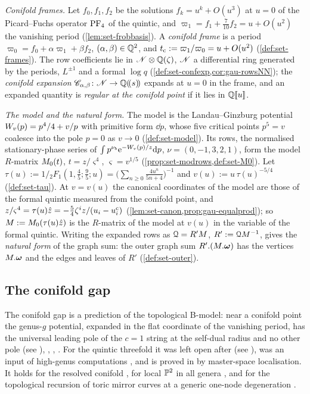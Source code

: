\emph{Conifold frames.} Let $f_0,f_1,f_2$ be the solutions $f_k=u^k+O(u^3)$ at $u=0$ of the Picard--Fuchs operator $\mathrm{PF}_{4}$ of the quintic, and $\varpi_1=f_1+\frac7{10}f_2=u+O(u^2)$ the vanishing period (\cref{lem:set-frobbasis}). A \emph{conifold frame} is a period $\varpi_0=f_0+\alpha\varpi_1+\beta f_2$, $(\alpha,\beta)\in\mathbb{Q}^2$, and $t_{\mathrm{c}}:=\varpi_1/\varpi_0=u+O(u^2)$ (\cref{def:set-frames}). The row coefficients lie in $\mathscr{N}\otimes\mathbb{Q}(\zeta)$, $\mathscr{N}$ a differential ring generated by the periods, $L^{\pm1}$ and a formal $\log q$ (\cref{def:set-confexp,cor:gau-rowsNN}); the \emph{conifold expansion} $\mathscr{C}_{\alpha,\beta}\colon\mathscr{N}\to\mathbb{Q}(\!(s)\!)$ expands at $u=0$ in the frame, and an expanded quantity is \emph{regular at the conifold point} if it lies in $\mathbb{Q}[\![ u ]\!]$.

\emph{The model and the natural form.} The model is the Landau--Ginzburg potential $W_{v}(p)=p^4/4+v/p$ with primitive form $\dd p$, whose five critical points $p^5=v$ coalesce into the pole $p=0$ as $v\to0$ (\cref{def:set-model}). Its rows, the normalised stationary-phase series of $\int p^{\nu_b}\mathrm{e}^{-W_{v}(p)/z}\mathrm{d} p$, $\nu=(0,-1,3,2,1)$, form the model $R$-matrix $M_{0}(t)$, $t=z/\varsigma^4$, $\varsigma=v^{1/5}$ (\cref{prop:set-modrows,def:set-M0}). Let $\tau(u):=1/{}_2F_1(1,\frac45;\frac95;u)=\bigl(\sum_{n\geq0}\frac{4u^n}{5n+4}\bigr)^{-1}$ and $v(u):=u\,\tau(u)^{-5/4}$ (\cref{def:set-tau}). At $v=v(u)$ the canonical coordinates of the model are those of the formal quintic measured from the conifold point, and $z/\varsigma^4=\tau(u)\hat{z}=-\frac54\zeta^iz/(u_i-u_i^{\mathrm c})$ (\cref{lem:set-canon,prop:gau-equalprod}); so $M:=M_{0}(\tau(u)\hat{z})$ is the $R$-matrix of the model at $v(u)$ in the variable of the formal quintic. Writing the expanded rows as $\mathcal{Q}=R'M$, $R':=\mathcal{Q} M^{-1}$, gives the \emph{natural form} of the graph sum: the outer graph sum $R'.(M.\boldsymbol{\omega})$ has the vertices $M.\boldsymbol{\omega}$ and the edges and leaves of $R'$ (\cref{def:set-outer}).

\subsection{The conifold gap}
\label{sec:int-gap}

The conifold gap is a prediction of the topological B-model: near a conifold point the genus-$g$ potential, expanded in the flat coordinate of the vanishing period, has the universal leading pole of the $c=1$ string at the self-dual radius and no other pole \cite{Bershadsky:1993cx} (see \cite[\S1]{HKQ09}), \cite{Ghoshal:1995wm}, \cite[\S2.3]{HK07}, \cite[(1.2)]{HKQ09}. For the quintic threefold it was left open after \cite{GJR18,CGL21,CGL26} (see \cite[Remark~1.6]{GJR18}), was an input of high-genus computations \cite{HKQ09,LR22}, and is proved in \cite[Theorem~2]{CGYZ26} by master-space localisation. It holds for the resolved conifold \cite[\S1.1, footnote~1]{Br25}, for local $\mathbb{P}^2$ in all genera \cite{Br25}, and for the topological recursion of toric mirror curves at a generic one-node degeneration \cite{FCCZ26}.

